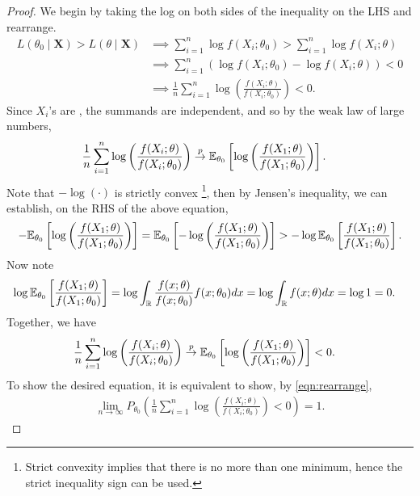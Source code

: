 \begin{proof}
We begin by taking the log on both sides of the inequality on the LHS and rearrange. 
\begin{align}
L(\theta_0 \mid \bm{X}) > L(\theta \mid \bm{X}) &\implies \sum_{i=1}^n \log f(X_i;\theta_0) > \sum_{i=1}^n \log f(X_i;\theta)\nonumber\\
&\implies \sum_{i=1}^n \left(\log f(X_i;\theta_0) - \log f(X_i;\theta)\right) < 0\nonumber \\
&\implies \frac{1}{n}\sum_{i=1}^n\log\left( \frac{f(X_i;\theta)}{f(X_i;\theta_0)} \right) < 0. \label{eqn:rearrange}
\end{align}
Since $X_i$'s are \iid, the summands are independent, and so by the weak law of large numbers,
\begin{align*}
\frac{1}{n}\sum_{i=1}^n\log\left( \frac{f(X_i;\theta)}{f(X_i;\theta_0)} \right) &\overset{p}{\rightarrow} \mathbb{E}_{\theta_0}\left[ \log \left( \frac{f(X_1; \theta)}{f(X_1; \theta_0)} \right) \right].
\end{align*}
Note that $-\log(\cdot)$ is strictly convex \footnote{Strict convexity implies that there is no more than one minimum, hence the strict inequality sign can be used.}, then by Jensen's inequality, we can establish, on the RHS of the above equation,
\begin{align*}
-\mathbb{E}_{\theta_0}\left[ \log \left( \frac{f(X_1; \theta)}{f(X_1; \theta_0)} \right) \right] = \mathbb{E}_{\theta_0}\left[ -\log \left( \frac{f(X_1; \theta)}{f(X_1; \theta_0)} \right) \right] > -\log \mathbb{E}_{\theta_0}\left[ \frac{f(X_1; \theta)}{f(X_1; \theta_0)}  \right].
\end{align*}
Now note
\begin{align}
\log \mathbb{E}_{\theta_0} \left[ \frac{f(X_1; \theta)}{f(X_1; \theta_0)} \right] &= \log \int_{\mathbb{R}} \frac{f(x; \theta)}{f(x; \theta_0)} f(x; \theta_0) dx = \log\int_{\mathbb{R}} f(x; \theta) dx = \log 1 = 0. \label{eqn:regularity}
\end{align}
Together, we have
\begin{align}
\frac{1}{n}\sum_{i=1}^n\log\left( \frac{f(X_i;\theta)}{f(X_i;\theta_0)} \right) &\overset{p}{\rightarrow} \mathbb{E}_{\theta_0}\left[ \log \left( \frac{f(X_1; \theta)}{f(X_1; \theta_0)} \right) \right] < 0. \label{eqn:convp}
\end{align}
To show the desired equation, it is equivalent to show, by \cref{eqn:rearrange},
\begin{align*}
\lim_{n\to\infty}P_{\theta_0}\left( \frac{1}{n}\sum_{i=1}^n\log\left( \frac{f(X_i;\theta)}{f(X_i;\theta_0)} \right) < 0 \right) = 1.

\end{align*}
\end{proof}
